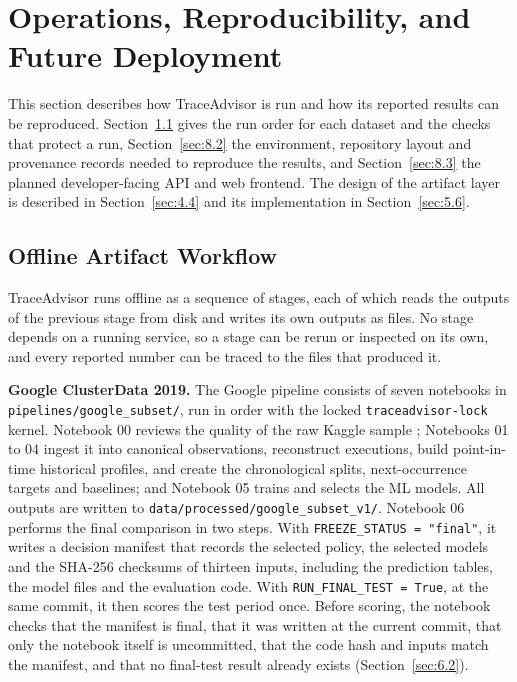 \documentclass{IEEEtran}
\begin{document}
\section{Operations, Reproducibility, and Future Deployment}\label{sec:8}

This section describes how TraceAdvisor is run and how its reported results can be reproduced. Section~\ref{sec:8.1} gives the run order for each dataset and the checks that protect a run, Section~\ref{sec:8.2} the environment, repository layout and provenance records needed to reproduce the results, and Section~\ref{sec:8.3} the planned developer-facing API and web frontend. The design of the artifact layer is described in Section~\ref{sec:4.4} and its implementation in Section~\ref{sec:5.6}.

\subsection{Offline Artifact Workflow}\label{sec:8.1}

TraceAdvisor runs offline as a sequence of stages, each of which reads the outputs of the previous stage from disk and writes its own outputs as files. No stage depends on a running service, so a stage can be rerun or inspected on its own, and every reported number can be traced to the files that produced it.

\textbf{Google ClusterData 2019.} The Google pipeline consists of seven notebooks in \texttt{pipelines/google\_subset/}, run in order with the locked \texttt{traceadvisor-lock} kernel. Notebook 00 reviews the quality of the raw Kaggle sample \cite{ref7}; Notebooks 01 to 04 ingest it into canonical observations, reconstruct executions, build point-in-time historical profiles, and create the chronological splits, next-occurrence targets and baselines; and Notebook 05 trains and selects the ML models. All outputs are written to \texttt{data/processed/google\_subset\_v1/}. Notebook 06 performs the final comparison in two steps. With \texttt{FREEZE\_STATUS\ =\ "final"}, it writes a decision manifest that records the selected policy, the selected models and the SHA-256 checksums of thirteen inputs, including the prediction tables, the model files and the evaluation code. With \texttt{RUN\_FINAL\_TEST\ =\ True}, at the same commit, it then scores the test period once. Before scoring, the notebook checks that the manifest is final, that it was written at the current commit, that only the notebook itself is uncommitted, that the code hash and inputs match the manifest, and that no final-test result already exists (Section~\ref{sec:6.2}).
\end{document}
